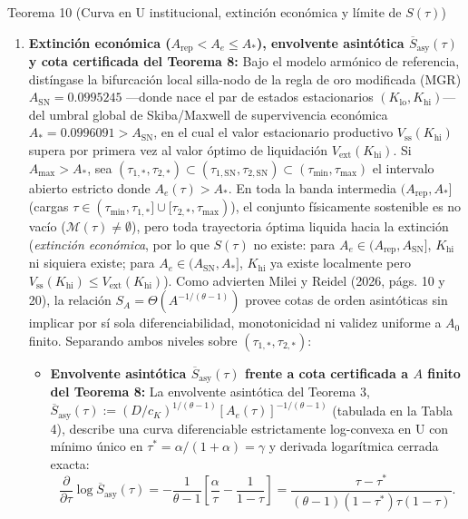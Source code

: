 \documentclass[11pt,letterpaper]{article}
\theoremstyle{plain}
\newtheorem*{namedthm}{\protect\namedthmname}
\newcommand{\namedthmname}{}
\newenvironment{thm_box}[1]{\renewcommand{\namedthmname}{#1}\begin{namedthm}}{\end{namedthm}}
\begin{document}
\begin{thm_box}{Teorema 10 (Curva en U institucional, extinción económica y límite de $S(\tau)$)}
\begin{enumerate}
\item \textbf{Extinción económica ($A_{\mathrm{rep}}<A_e\le A_*$), envolvente asintótica $\overline{S}_{\mathrm{asy}}(\tau)$ y cota certificada del Teorema 8:} Bajo el modelo armónico de referencia, distíngase la bifurcación local silla-nodo de la regla de oro modificada (MGR) $A_{\mathrm{SN}}=0.0995245$ ---donde nace el par de estados estacionarios $(K_{\mathrm{lo}},K_{\mathrm{hi}})$--- del umbral global de Skiba/Maxwell de supervivencia económica $A_*=0.0996091 > A_{\mathrm{SN}}$, en el cual el valor estacionario productivo $V_{\mathrm{ss}}(K_{\mathrm{hi}})$ supera por primera vez al valor óptimo de liquidación $V_{\mathrm{ext}}(K_{\mathrm{hi}})$. Si $A_{\max}>A_*$, sea $(\tau_{1,*},\tau_{2,*})\subset(\tau_{1,\mathrm{SN}},\tau_{2,\mathrm{SN}})\subset(\tau_{\min},\tau_{\max})$ el intervalo abierto estricto donde $A_e(\tau)>A_*$. En toda la banda intermedia $(A_{\mathrm{rep}},A_*]$ (cargas $\tau\in(\tau_{\min},\tau_{1,*}]\cup[\tau_{2,*},\tau_{\max})$), el conjunto físicamente sostenible es no vacío ($\mathcal{M}(\tau)\neq\emptyset$), pero toda trayectoria óptima liquida hacia la extinción (\emph{extinción económica}, por lo que $S(\tau)$ no existe: para $A_e\in(A_{\mathrm{rep}},A_{\mathrm{SN}}]$, $K_{\mathrm{hi}}$ ni siquiera existe; para $A_e\in(A_{\mathrm{SN}},A_*]$, $K_{\mathrm{hi}}$ ya existe localmente pero $V_{\mathrm{ss}}(K_{\mathrm{hi}})\le V_{\mathrm{ext}}(K_{\mathrm{hi}})$). Como advierten Milei y Reidel (2026, págs. 10 y 20), la relación $S_A=\Theta(A^{-1/(\theta-1)})$ provee cotas de orden asintóticas sin implicar por sí sola diferenciabilidad, monotonicidad ni validez uniforme a $A_0$ finito. Separando ambos niveles sobre $(\tau_{1,*},\tau_{2,*})$:
\begin{itemize}
\item[(a)] \textbf{Envolvente asintótica $\overline{S}_{\mathrm{asy}}(\tau)$ frente a cota certificada a $A$ finito del Teorema 8:} La envolvente asintótica del Teorema 3, $\overline{S}_{\mathrm{asy}}(\tau) := (D/c_K)^{1/(\theta-1)}[A_e(\tau)]^{-1/(\theta-1)}$ (tabulada en la Tabla 4), describe una curva diferenciable estrictamente log-convexa en U con mínimo único en $\tau^*=\alpha/(1+\alpha)=\gamma$ y derivada logarítmica cerrada exacta:
\[
\frac{\partial}{\partial\tau}\log\overline{S}_{\mathrm{asy}}(\tau) = -\frac{1}{\theta-1}\left[\frac{\alpha}{\tau} - \frac{1}{1-\tau}\right] = \frac{\tau-\tau^*}{(\theta-1)(1-\tau^*)\tau(1-\tau)}.
\]

\end{itemize}
\end{enumerate}
\end{thm_box}
\end{document}
